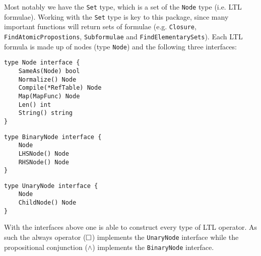 Most notably we have the \verb=Set= type, which is a set of the \verb=Node= type (i.e. LTL formulae). Working with the \verb=Set= type is key to this package, since many important functions will return sets of formulae (e.g. \verb=Closure=, \verb=FindAtomicPropostions=, \verb=Subformulae= and \verb=FindElementarySets=). Each LTL formula is made up of nodes (type \verb=Node=) and the following three interfaces:
\begin{lstlisting}[language=Golang, caption={Definition of \texttt{Node} interface}, floatplacement=H]
type Node interface {
	SameAs(Node) bool
	Normalize() Node
	Compile(*RefTable) Node
	Map(MapFunc) Node
	Len() int
	String() string
}
\end{lstlisting}

\begin{lstlisting}[language=Golang, caption={Definition of \texttt{BinaryNode} interface.}, floatplacement=H]
type BinaryNode interface {
	Node
	LHSNode() Node
	RHSNode() Node
}
\end{lstlisting}

\begin{lstlisting}[language=Golang, caption={Definition of \texttt{UnaryNode} interface.}, floatplacement=H]
type UnaryNode interface {
	Node
	ChildNode() Node
}
\end{lstlisting}
With the interfaces above one is able to construct every type of LTL operator. As such the always operator ($\square$) implements the \verb=UnaryNode= interface while the propositional conjunction ($\land$) implements the \verb=BinaryNode= interface.

